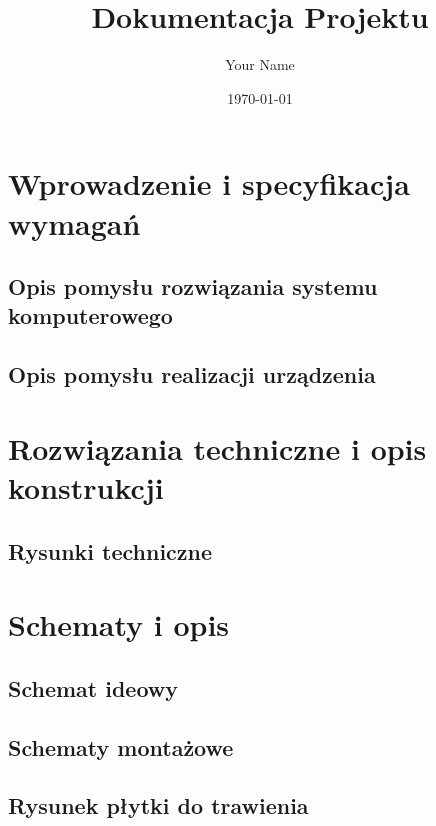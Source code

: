 \documentclass{article}
\title{Dokumentacja Projektu}
\author{Your Name}
\date{\today}
\begin{document}
\maketitle

\section{Wprowadzenie i specyfikacja wymagań}
\subsection{Opis pomysłu rozwiązania systemu komputerowego}

\subsection{Opis pomysłu realizacji urządzenia}

\section{Rozwiązania techniczne i opis konstrukcji}
\subsection{Rysunki techniczne}

\section{Schematy i opis}
\subsection{Schemat ideowy}

\subsection{Schematy montażowe}

\subsection{Rysunek płytki do trawienia}
\end{document}
